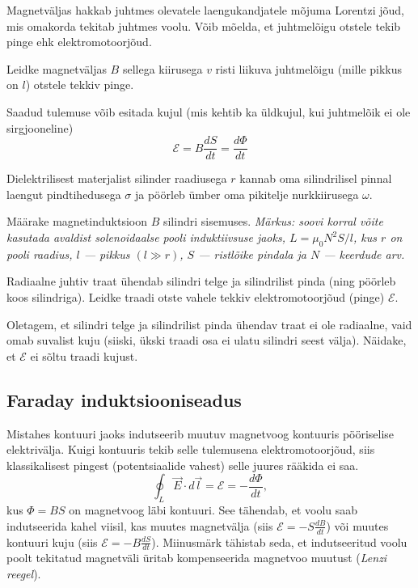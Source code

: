\documentclass[a4paper,11pt,twocolumn]{article}
\begin{document}
Magnetväljas hakkab juhtmes olevatele laengukandjatele mõjuma Lorentzi jõud, mis omakorda tekitab juhtmes voolu. Võib mõelda, et juhtmelõigu otstele tekib pinge ehk elektromotoorjõud.

\begin{question}
    Leidke magnetväljas $B$ sellega kiirusega $v$ risti liikuva juhtmelõigu (mille pikkus on $l$) otstele tekkiv pinge.
\end{question}

Saadud tulemuse võib esitada kujul (mis kehtib ka üldkujul, kui juhtmelõik ei ole sirgjooneline)
\[ \mathcal{E}=B \frac{dS}{dt}=\frac{d\Phi}{dt} \]

\begin{question}[E-S 2011, P3]
    Dielektrilisest materjalist silinder raadiusega $r$ kannab oma silindrilisel pinnal laengut pindtihedusega $\sigma$ ja pöörleb ümber oma pikitelje nurkkiirusega $\omega$.
    \begin{subquestion}
    \item Määrake magnetinduktsioon $B$ silindri sisemuses. \textit{Märkus: soovi korral võite kasutada avaldist solenoidaalse pooli induktiivsuse jaoks, $L = \mu_0 N^{2}S/l$, kus $r$ on pooli raadius, $l$ — pikkus $(l\gg r)$, $S$ — ristlõike pindala ja $N$ — keerdude arv.}
    \item Radiaalne juhtiv traat ühendab silindri telge ja silindrilist pinda (ning pöörleb koos silindriga). Leidke traadi otste vahele tekkiv elektromotoorjõud (pinge) $\mathcal{E}$.
    \item Oletagem, et silindri telge ja silindrilist pinda ühendav traat ei ole radiaalne, vaid omab suvalist kuju (siiski, ükski traadi osa ei ulatu silindri seest välja). Näidake, et $\mathcal{E}$ ei sõltu traadi kujust.
    \end{subquestion}
\end{question}

\subsection{Faraday induktsiooniseadus}

Mistahes kontuuri jaoks indutseerib muutuv magnetvoog kontuuris pööriselise elektrivälja. Kuigi kontuuris tekib selle tulemusena elektromotoorjõud, siis klassikalisest pingest (potentsiaalide vahest) selle juures rääkida ei saa.
\begin{equation}
    \oint_L \vec{E} \cdot d\vec{l} = \mathcal{E} = -\frac{d\Phi}{dt} \tag{IV Maxwelli võrrand},
\end{equation}
kus $\Phi=BS$ on magnetvoog läbi kontuuri. See tähendab, et voolu saab indutseerida kahel viisil, kas muutes magnetvälja (siis $\mathcal{E}=-S\frac{dB}{dt}$) või muutes kontuuri kuju (siis $\mathcal{E}=-B\frac{dS}{dt}$). Miinusmärk tähistab seda, et indutseeritud voolu poolt tekitatud magnetväli üritab kompenseerida magnetvoo muutust (\textit{Lenzi reegel}).
\end{document}
